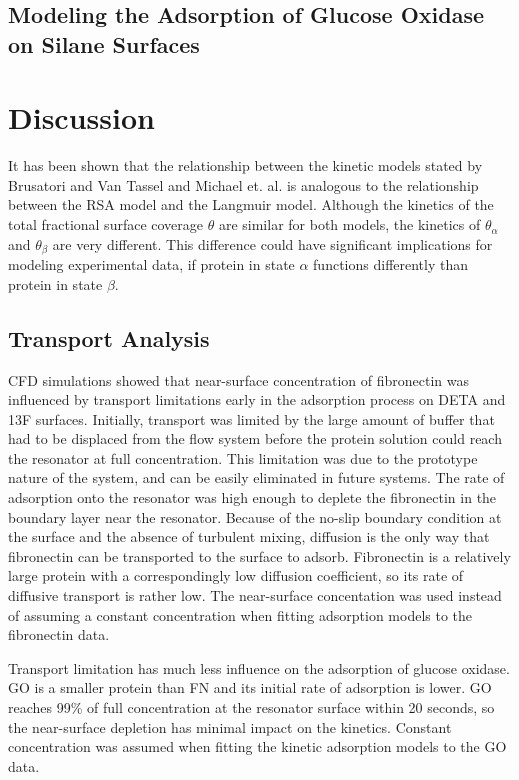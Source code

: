 \subsection{Modeling the Adsorption of Glucose Oxidase on Silane Surfaces}


\section{Discussion}

It has been shown that the relationship between the kinetic models
stated by Brusatori and Van Tassel \cite{Brusatori1999} and Michael
et. al. \cite{Michael2003} is analogous to the relationship between
the RSA model and the Langmuir model. Although the kinetics of the
total fractional surface coverage $\theta$ are similar for both models,
the kinetics of $\theta_{\alpha}$ and $\theta_{\beta}$ are very
different. This difference could have significant implications for
modeling experimental data, if protein in state $\alpha$ functions
differently than protein in state $\beta$.


\subsection{Transport Analysis}

CFD simulations showed that near-surface concentration of fibronectin
was influenced by transport limitations early in the adsorption process
on DETA and 13F surfaces. Initially, transport was limited by the
large amount of buffer that had to be displaced from the flow system
before the protein solution could reach the resonator at full concentration.
This limitation was due to the prototype nature of the system, and
can be easily eliminated in future systems. The rate of adsorption
onto the resonator was high enough to deplete the fibronectin in the
boundary layer near the resonator. Because of the no-slip boundary
condition at the surface and the absence of turbulent mixing, diffusion
is the only way that fibronectin can be transported to the surface
to adsorb. Fibronectin is a relatively large protein with a correspondingly
low diffusion coefficient, so its rate of diffusive transport is rather
low. The near-surface concentation was used instead of assuming a
constant concentration when fitting adsorption models to the fibronectin
data.

Transport limitation has much less influence on the adsorption of
glucose oxidase. GO is a smaller protein than FN and its initial rate
of adsorption is lower. GO reaches 99\% of full concentration at the
resonator surface within 20 seconds, so the near-surface depletion
has minimal impact on the kinetics. Constant concentration was assumed
when fitting the kinetic adsorption models to the GO data.

